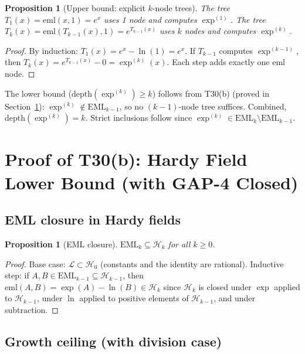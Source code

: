 \documentclass[12pt,a4paper]{article}
\newtheorem{proposition}[theorem]{Proposition}
\theoremstyle{definition}
\theoremstyle{remark}
\begin{document}
\begin{proposition}[Upper bound: explicit $k$-node trees]\label{prop:ub}
The tree $T_1(x) = \mathrm{eml}(x,1) = e^x$ uses 1 node and computes $\exp^{(1)}$.
The tree $T_k(x) = \mathrm{eml}(T_{k-1}(x), 1) = e^{T_{k-1}(x)}$ uses $k$ nodes
and computes $\exp^{(k)}$.
\end{proposition}
\begin{proof}
By induction: $T_1(x) = e^x - \ln(1) = e^x$.
If $T_{k-1}$ computes $\exp^{(k-1)}$, then $T_k(x) = e^{T_{k-1}(x)} - 0 = \exp^{(k)}(x)$.
Each step adds exactly one $\mathrm{eml}$ node.
\end{proof}

The lower bound ($\mathrm{depth}(\exp^{(k)}) \geq k$) follows from T30(b)
(proved in Section~\ref{sec:hardy}): $\exp^{(k)} \notin \mathrm{EML}_{k-1}$,
so no $(k-1)$-node tree suffices.  Combined, $\mathrm{depth}(\exp^{(k)}) = k$.
Strict inclusions follow since $\exp^{(k)} \in \mathrm{EML}_k \setminus \mathrm{EML}_{k-1}$.

\section{Proof of T30(b): Hardy Field Lower Bound (with GAP-4 Closed)}
\label{sec:hardy}

\subsection{EML closure in Hardy fields}

\begin{proposition}[EML closure]\label{prop:closure}
$\mathrm{EML}_k \subseteq \mathcal{H}_k$ for all $k \geq 0$.
\end{proposition}
\begin{proof}
Base case: $\mathcal{L} \subset \mathcal{H}_0$ (constants and the identity are rational).
Inductive step: if $A, B \in \mathrm{EML}_{k-1} \subseteq \mathcal{H}_{k-1}$, then
$\mathrm{eml}(A,B) = \exp(A) - \ln(B) \in \mathcal{H}_k$ since $\mathcal{H}_k$ is
closed under $\exp$ applied to $\mathcal{H}_{k-1}$, under $\ln$ applied to positive
elements of $\mathcal{H}_{k-1}$, and under subtraction.
\end{proof}

\subsection{Growth ceiling (with division case)}
\end{document}
